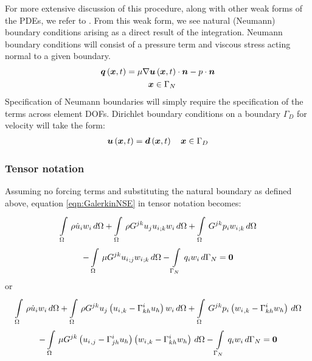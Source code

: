 For more extensive discussion of this procedure, along with other weak forms of the PDEs, we refer to \cite{gresho:2000}. From this weak form, we see natural (Neumann) boundary conditions arising as a direct result of the integration. Neumann boundary conditions will consist of a pressure term and viscous stress acting normal to a given boundary. 
\begin{gather}
 \label{eqn:NSENeumannBC}  
   \fnof{\vectr{q}}{\vectr{x},t} = \mu\dotprod{\gradient{}{\fnof{\vectr{u}}{\vectr{x},t}}}{\normal}-p\cdot{\normal}  \\
   \quad \vectr{x}\in\Gamma_{N}
\end{gather}
Specification of Neumann boundaries will simply require the specification of the terms across element DOFs. Dirichlet boundary conditions on a boundary $\Gamma_D$ for velocity will take the form:
\begin{gather}
 \label{eqn:NSEDirichletBC} 
   \boldsymbol{u}\left( \boldsymbol{x},t \right)  =  \boldsymbol{d}\left( \boldsymbol{x},t \right)  \quad \boldsymbol{x}\in\Gamma_{D}\\
\end{gather}

\subsubsection{Tensor notation}
Assuming no forcing terms and substituting the natural boundary as defined above, equation \ref{eqn:GalerkinNSE} in tensor notation becomes:
\begin{multline}
 \label{TensorNSE}
    \displaystyle\int\limits_{\Omega}^{} \,\rho\dot{u}_{i}w_{i}\,d\Omega 
 +  \displaystyle\int\limits_{\Omega}^{} \,{\rho}G^{jk}u_{j} {u_{i}}_{;k} w_{i}\,d\Omega 
 +  \displaystyle\int\limits_{\Omega}^{} \,G^{jk}{p_{i}} {w_{i}}_{;k} \,d\Omega \\
 -  \displaystyle\int\limits_{\Omega}^{} \,{\mu}G^{jk} {u_{i}}_{;j}  {w_{i}}_{;k} \,d\Omega 
 -  \displaystyle\int\limits_{\Gamma_N}^{} \,{q_{i}}{w_i}\,d\Gamma_N =\boldsymbol{0}
\end{multline}
or
\begin{multline}
 \label{Tensor2NSE}
    \displaystyle\int\limits_{\Omega}^{} \,\rho\dot{u}_{i}w_{i}\,d\Omega 
 +  \displaystyle\int\limits_{\Omega}^{} \,{\rho}G^{jk}{u_j}\left(  {u_{i}}_{,k} - \Gamma^{i}_{kh} u_h \right){w_{i}}\,d\Omega 
 +  \displaystyle\int\limits_{\Omega}^{} \,G^{jk}{p_{i}}\left(  {w_{i}}_{,k} - \Gamma^{i}_{kh} w_h \right)\,d\Omega \\
 -  \displaystyle\int\limits_{\Omega}^{} \,{\mu}G^{jk}\left(  {u_{i}}_{,j} - \Gamma^{i}_{jh} u_h \right)\left(  {w_{i}}_{,k} - \Gamma^{i}_{kh} w_h \right)\,d\Omega 
 -  \displaystyle\int\limits_{\Gamma_N}^{} \,{q_{i}}{w_i}\,d\Gamma_N =\boldsymbol{0}
\end{multline}


